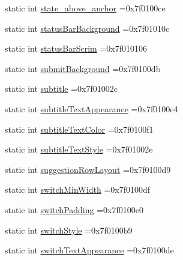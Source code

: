 \begin{DoxyCompactItemize}
\item 
static int \hyperlink{classandroid_1_1support_1_1graphics_1_1drawable_1_1animated_1_1R_1_1attr_a9b6b1eba11e17dd6de7123f3ef08a692}{state\+\_\+above\+\_\+anchor} =0x7f0100ce
\item 
static int \hyperlink{classandroid_1_1support_1_1graphics_1_1drawable_1_1animated_1_1R_1_1attr_a909896bc8ac0425ac86276ba585a5277}{status\+Bar\+Background} =0x7f01010c
\item 
static int \hyperlink{classandroid_1_1support_1_1graphics_1_1drawable_1_1animated_1_1R_1_1attr_a68fae95d60e6bda6c6fc4b412c23ce0c}{status\+Bar\+Scrim} =0x7f010106
\item 
static int \hyperlink{classandroid_1_1support_1_1graphics_1_1drawable_1_1animated_1_1R_1_1attr_a9eeb8a2a8065d810833081c713ddc204}{submit\+Background} =0x7f0100db
\item 
static int \hyperlink{classandroid_1_1support_1_1graphics_1_1drawable_1_1animated_1_1R_1_1attr_a2192a91653ec955f060009b3c526ce38}{subtitle} =0x7f01002c
\item 
static int \hyperlink{classandroid_1_1support_1_1graphics_1_1drawable_1_1animated_1_1R_1_1attr_a680ed757d4c7049e04b519856ba8a9be}{subtitle\+Text\+Appearance} =0x7f0100e4
\item 
static int \hyperlink{classandroid_1_1support_1_1graphics_1_1drawable_1_1animated_1_1R_1_1attr_a8d0b074f45038592bb934a91b1bdc161}{subtitle\+Text\+Color} =0x7f0100f1
\item 
static int \hyperlink{classandroid_1_1support_1_1graphics_1_1drawable_1_1animated_1_1R_1_1attr_a540b592c68f05f7ccdd4d4c4ae627b98}{subtitle\+Text\+Style} =0x7f01002e
\item 
static int \hyperlink{classandroid_1_1support_1_1graphics_1_1drawable_1_1animated_1_1R_1_1attr_ab4cc97bcd919e7e9e7f9121a7e4b4bc1}{suggestion\+Row\+Layout} =0x7f0100d9
\item 
static int \hyperlink{classandroid_1_1support_1_1graphics_1_1drawable_1_1animated_1_1R_1_1attr_ad0581ff146f1cafef598f3bcf8ae12e2}{switch\+Min\+Width} =0x7f0100df
\item 
static int \hyperlink{classandroid_1_1support_1_1graphics_1_1drawable_1_1animated_1_1R_1_1attr_a945fb4fcb4450ea6c20fcdc45c73affd}{switch\+Padding} =0x7f0100e0
\item 
static int \hyperlink{classandroid_1_1support_1_1graphics_1_1drawable_1_1animated_1_1R_1_1attr_a5edca24a9f0c08d31f33c2d9dad572a5}{switch\+Style} =0x7f0100b9
\item 
static int \hyperlink{classandroid_1_1support_1_1graphics_1_1drawable_1_1animated_1_1R_1_1attr_a907b90a951e32740520e78f47fd707e3}{switch\+Text\+Appearance} =0x7f0100de

\end{DoxyCompactItemize}
